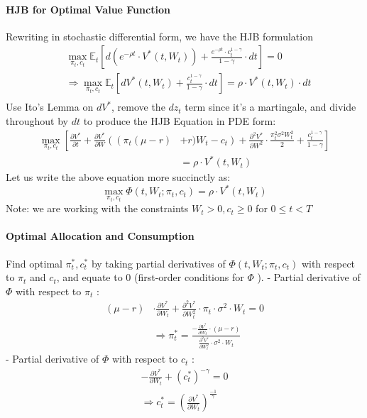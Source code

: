 \documentclass[11pt]{article}
\begin{document}
\paragraph*{HJB for Optimal Value Function}
Rewriting in stochastic differential form, we have the HJB formulation
$$
\begin{aligned}
& \max _{\pi_t, c_t} \mathbb{E}_t\left[d\left(e^{-\rho t} \cdot V^*\left(t, W_t\right)\right)+\frac{e^{-\rho t} \cdot c_t^{1-\gamma}}{1-\gamma} \cdot d t\right]=0 \\
& \Rightarrow \max _{\pi_t, c_t} \mathbb{E}_t\left[d V^*\left(t, W_t\right)+\frac{c_t^{1-\gamma}}{1-\gamma} \cdot d t\right]=\rho \cdot V^*\left(t, W_t\right) \cdot d t \\
&
\end{aligned}
$$
Use Ito's Lemma on $d V^*$, remove the $d z_t$ term since it's a martingale, and divide throughout by $d t$ to produce the HJB Equation in PDE form:
$$
\begin{aligned}
\max _{\pi_t, c_t}\left[\frac{\partial V^*}{\partial t}+\frac{\partial V^*}{\partial W}\left(\left(\pi_t(\mu-r)\right.\right.\right. & \left.\left.+r) W_t-c_t\right)+\frac{\partial^2 V^*}{\partial W^2} \cdot \frac{\pi_t^2 \sigma^2 W_t^2}{2}+\frac{c_t^{1-\gamma}}{1-\gamma}\right] \\
& =\rho \cdot V^*\left(t, W_t\right)
\end{aligned}
$$
Let us write the above equation more succinctly as:
$$
\max _{\pi_t, c_t} \Phi\left(t, W_t ; \pi_t, c_t\right)=\rho \cdot V^*\left(t, W_t\right)
$$
Note: we are working with the constraints $W_t>0, c_t \geq 0$ for $0 \leq t<T$

\paragraph*{Optimal Allocation and Consumption}
Find optimal $\pi_t^*, c_t^*$ by taking partial derivatives of $\Phi\left(t, W_t ; \pi_t, c_t\right)$ with respect to $\pi_t$ and $c_t$, and equate to 0 (first-order conditions for $\Phi$ ).
- Partial derivative of $\Phi$ with respect to $\pi_t$ :
$$
\begin{aligned}
(\mu-r) & \cdot \frac{\partial V^*}{\partial W_t}+\frac{\partial^2 V^*}{\partial W_t^2} \cdot \pi_t \cdot \sigma^2 \cdot W_t=0 \\
& \Rightarrow \pi_t^*=\frac{-\frac{\partial V^*}{\partial W_t} \cdot(\mu-r)}{\frac{\partial^2 V^*}{\partial W_t^2} \cdot \sigma^2 \cdot W_t}
\end{aligned}
$$
- Partial derivative of $\Phi$ with respect to $c_t$ :
$$
\begin{gathered}
-\frac{\partial V^*}{\partial W_t}+\left(c_t^*\right)^{-\gamma}=0 \\
\Rightarrow c_t^*=\left(\frac{\partial V^*}{\partial W_t}\right)^{\frac{-1}{\gamma}}
\end{gathered}
$$
\end{document}
